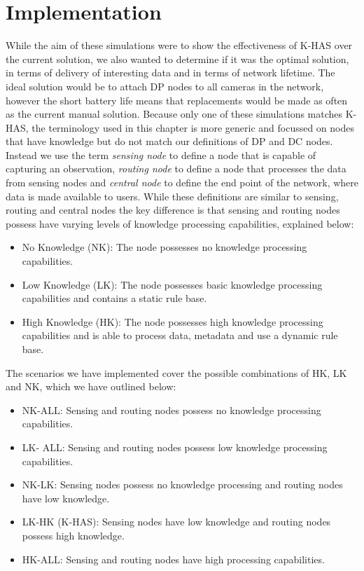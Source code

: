 \section{Implementation}\label{sim:imp}
	While the aim of these simulations were to show the effectiveness of K-HAS over the current solution, we also wanted to determine if it was the optimal solution, in terms of delivery of interesting data and in terms of network lifetime. The ideal solution would be to attach DP nodes to all cameras in the network, however the short battery life means that replacements would be made as often as the current manual solution. Because only one of these simulations matches K-HAS, the terminology used in this chapter is more generic and focussed on nodes that have knowledge but do not match our definitions of DP and DC nodes. Instead we use the term \textit{sensing node} to define a node that is capable of capturing an observation, \textit{routing node} to define a node that processes the data from sensing nodes and \textit{central node} to define the end point of the network, where data is made available to users. While these definitions are similar to sensing, routing and central nodes the key difference is that sensing and routing nodes possess have varying levels of knowledge processing capabilities, explained below:
	
	\begin{itemize}
		\item No Knowledge (NK): The node possesses no knowledge processing capabilities.
		\item Low Knowledge (LK): The node possesses basic knowledge processing capabilities and contains a static rule base.
		\item High Knowledge (HK): The node possesses high knowledge processing capabilities and is able to process data, metadata and use a dynamic rule base.
	\end{itemize}
	
	The scenarios we have implemented cover the possible combinations of HK, LK and NK, which we have outlined below:
	
	\begin{itemize}
		\item NK-ALL: Sensing and routing nodes possess no knowledge processing capabilities.
		\item LK- ALL: Sensing and routing nodes possess low knowledge processing capabilities.
		\item NK-LK: Sensing nodes possess no knowledge processing and routing nodes have low knowledge.
		\item LK-HK (K-HAS): Sensing nodes have low knowledge and routing nodes possess high knowledge.
		\item HK-ALL: Sensing and routing nodes have high processing capabilities.
	\end{itemize}

